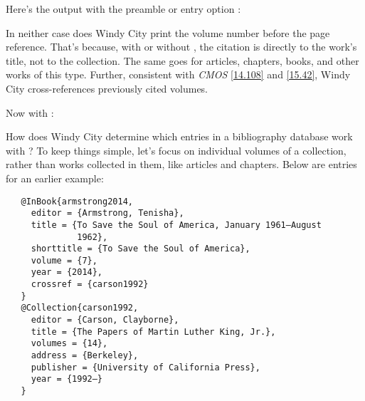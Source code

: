 \documentclass[11pt,letterpaper,oneside]{article}
\begin{document}
\noindent Here's the output with the preamble or entry option
:

\begin{citebib}
\item \cite[169--71]{king2014}
\item \cite[170]{king2014}
\end{citebib}

In neither case does Windy City print the volume number before the
page reference. That's because, with or without , the
citation is directly to the work's title, not to the collection. The
same goes for articles, chapters, books, and other works of this type.
Further, consistent with \textit{CMOS} \ref{14.108} and \ref{15.42},
Windy City cross-references previously cited volumes.


\begin{citebib}
\item \cite[56]{doe2018}
\item \cite[128]{edwards2018}
\nocite{jones2018}
\end{citebib}

\noindent Now with :

\begin{citebib}
\item \cite[56]{doe2018}
\item \cite[128]{edwards2018}
\nocite{jones2018}
\end{citebib}

How does Windy City determine which entries in a bibliography database
work with ? To keep things simple, let's focus on
individual volumes of a collection, rather than works collected in
them, like articles and chapters. Below are entries for an earlier
example:

\begin{verbatim}
   @InBook{armstrong2014,
     editor = {Armstrong, Tenisha},
     title = {To Save the Soul of America, January 1961–August
              1962},
     shorttitle = {To Save the Soul of America},
     volume = {7},
     year = {2014},
     crossref = {carson1992}
   }
   @Collection{carson1992,
     editor = {Carson, Clayborne},
     title = {The Papers of Martin Luther King, Jr.},
     volumes = {14},
     address = {Berkeley},
     publisher = {University of California Press},
     year = {1992–}
   }
\end{verbatim}
\end{document}
